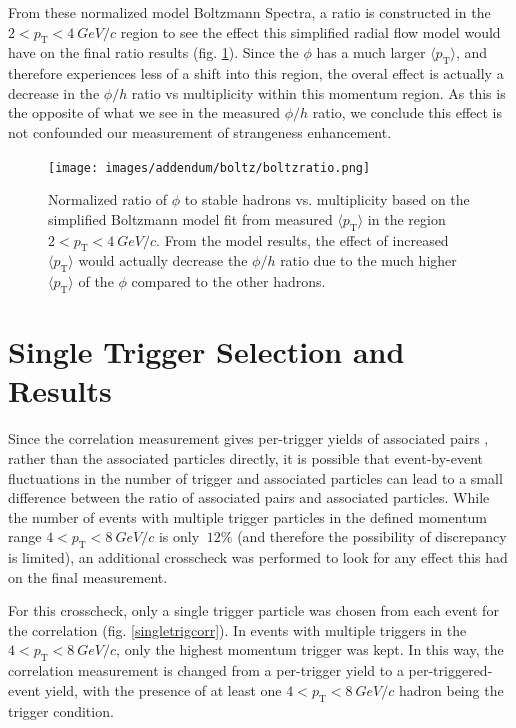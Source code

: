 \documentclass[ALICE,manyauthors]{ALICE_analysis_notes}
\begin{document}
From these normalized model Boltzmann Spectra, a ratio is constructed in the $2 < p_{\text{T}} < \SI{4}{GeV/c}$ region to see the effect this simplified radial flow model would have on the final ratio results (fig. \ref{boltzratio}).  Since the $\phi$ has a much larger $\langle p_{\text{T}} \rangle$, and therefore experiences less of a shift into this region, the overal effect is actually a decrease in the $\phi/h$ ratio vs multiplicity within this momentum region. As this is the opposite of what we see in the measured $\phi/h$ ratio, we conclude this effect is not confounded our measurement of strangeness enhancement.

\begin{figure}[ht]
\centering
\texttt{[image: images/addendum/boltz/boltzratio.png]}
\caption{Normalized ratio of $\phi$ to stable hadrons vs. multiplicity based on the simplified Boltzmann model fit from measured $\langle p_{\text{T}} \rangle$ in the region $2 < p_{\text{T}} < \SI{4}{GeV/c}$.  From the model results, the effect of increased $\langle p_{\text{T}} \rangle$ would actually decrease the $\phi/h$ ratio due to the much higher $\langle p_{\text{T}} \rangle$ of the $\phi$ compared to the other hadrons.}
\label{boltzratio}
\end{figure}

\section{Single Trigger Selection and Results}

Since the correlation measurement gives per-trigger yields of associated pairs , rather than the associated particles directly, it is possible that event-by-event fluctuations in the number of trigger and associated particles can lead to a small difference between the ratio of associated pairs and associated particles. While the number of events with multiple trigger particles in the defined momentum range $4 < p_{\text{T}} < \SI{8}{GeV/c}$ is only $~12\%$ (and therefore the possibility of discrepancy is limited), an additional crosscheck was performed to look for any effect this had on the final measurement.

For this crosscheck, only a single trigger particle was chosen from each event for the correlation (fig. \ref{singletrigcorr}).  In events with multiple triggers in the $4 < p_{\text{T}} < \SI{8}{GeV/c}$, only the highest momentum trigger was kept.  In this way, the correlation measurement is changed from a per-trigger yield to a per-triggered-event yield, with the presence of at least one $4 < p_{\text{T}} < \SI{8}{GeV/c}$ hadron being the trigger condition.
\end{document}
